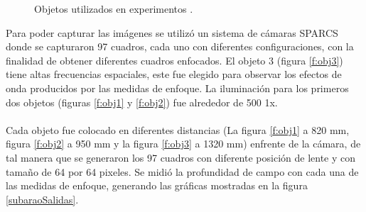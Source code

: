 \begin{figure}
 \centering
 \caption{Objetos utilizados en experimentos \citet{Subbarao1993}.}
 \label{f:objetosSubbarao}
\end{figure}

Para poder capturar las imágenes se utilizó un sistema de cámaras SPARCS donde se capturaron 97 cuadros, cada uno con diferentes configuraciones, con la finalidad de obtener diferentes cuadros enfocados. El objeto 3 (figura \ref{f:obj3}) tiene altas frecuencias espaciales, este fue elegido para observar los efectos de onda producidos por las medidas de enfoque. La iluminación para los primeros dos objetos (figuras \ref{f:obj1} y \ref{f:obj2}) fue alrededor de 500 1x.\\
\\
Cada objeto fue colocado en diferentes distancias (La figura \ref{f:obj1} a 820 mm, figura \ref{f:obj2} a 950 mm y la figura \ref{f:obj3} a 1320 mm) enfrente de la cámara, de tal manera que se generaron los 97 cuadros con diferente posición de lente y con tamaño de 64 por 64 pixeles. Se midió la profundidad de campo con cada una de las medidas de enfoque, generando las gráficas mostradas en la figura \ref{subaraoSalidas}.



